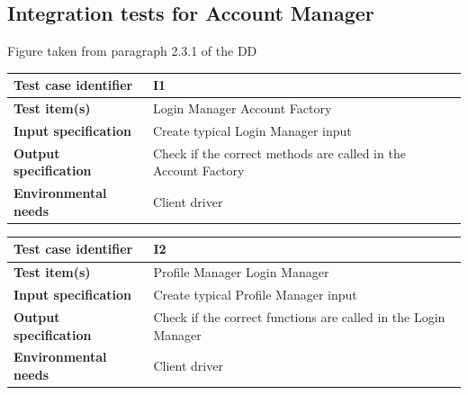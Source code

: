 \documentclass[a4paper,11pt]{report} %
\begin{document}
		\subsection{Integration tests for Account Manager}
		\begin{minipage}{\linewidth}
		\end{minipage}
		\begin{center}
			Figure taken from paragraph 2.3.1 of the DD
		\end{center} 
		\begin{center}
			\renewcommand{\arraystretch}{1.2}
			\setlength{\tabcolsep}{24pt}
			\begin{tabular}{ l  p{9cm}}\hline
				\textbf{Test case identifier} & I1\\\hline
				\textbf{Test item(s)} & Login Manager \textrightarrow Account Factory\\\hline
				\textbf{Input specification} & Create typical Login Manager input \\\hline
				\textbf{Output specification} & Check if the correct methods are called in the Account Factory\\\hline
				\textbf{Environmental needs} & Client driver\\\hline
			\end{tabular}
		\end{center}	
		\bigskip	
		\begin{center}
			\renewcommand{\arraystretch}{1.2}
			\setlength{\tabcolsep}{24pt}
			\begin{tabular}{ l  p{9cm}}\hline
				\textbf{Test case identifier} & I2\\\hline
				\textbf{Test item(s)} & Profile Manager \textrightarrow Login Manager\\\hline
				\textbf{Input specification} & Create typical Profile Manager input \\\hline
				\textbf{Output specification} & Check if the correct functions are called in the Login Manager\\\hline
				\textbf{Environmental needs} & Client driver\\\hline
			\end{tabular}
		\end{center}
				
\end{document}
